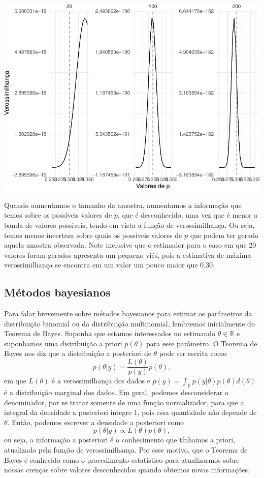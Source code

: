 \documentclass[]{book}
\begin{document}
\begin{center}\includegraphics[width=0.8\linewidth]{notas_livro_files/figure-latex/vero_bin2-1} \end{center}

Quando aumentamos o tamanho da amostra, aumentamos a informação que temos sobre os possíveis valores de \(p\), que é desconhecido, uma vez que é menor a banda de valores possíveis, tendo em vista a função de verossimilhança. Ou seja, temos menos incerteza sobre quais os possíveis valores de \(p\) que podem ter gerado aquela amostra observada. Note inclusive que o estimador para o caso em que 20 valores foram gerados apresenta um pequeno viés, pois a estimativa de máxima verossimilhança se encontra em um valor um pouco maior que 0,30.

\hypertarget{metodos-bayesianos}{%
\subsection{Métodos bayesianos}\label{metodos-bayesianos}}

Para falar brevemente sobre métodos bayesianos para estimar os parâmetros da distribuição binomial ou da distribuição multinomial, lembremos inicialmente do Teorema de Bayes. Suponha que estamos interessados no estimando \(\theta \in \mathbb{R}\) e suponhamos uma distribuição a priori \(p(\theta)\) para esse parâmetro. O Teorema de Bayes nos diz que a distribuição a posteriori de \(\theta\) pode ser escrita como
\[
p(\theta | y) = \frac{L(\theta)}{p(y)} p(\theta),
\]
em que \(L(\theta)\) é a verossimilhança dos dados e \(p(y) = \int_\mathbb{R} p(y|\theta) p(\theta) d(\theta)\) é a distribuição marginal dos dados. Em geral, podemos desconsiderar o denominador, por se tratar somente de uma função normalizador, para que a integral da densidade a posteriori integre 1, pois essa quantidade não depende de \(\theta\). Então, podemos escrever a densidade a posteriori como
\[
p(\theta | y) \propto L(\theta) p(\theta),
\]
ou seja, a informação a posteriori é o conhecimento que tínhamos a priori, atualizado pela função de verossimilhança. Por esse motivo, que o Teorema de Bayes é conhecido como o procedimento estatístico para atualizarmos sobre nossas crenças sobre valores desconhecidos quando obtemos novas informações.
\end{document}
